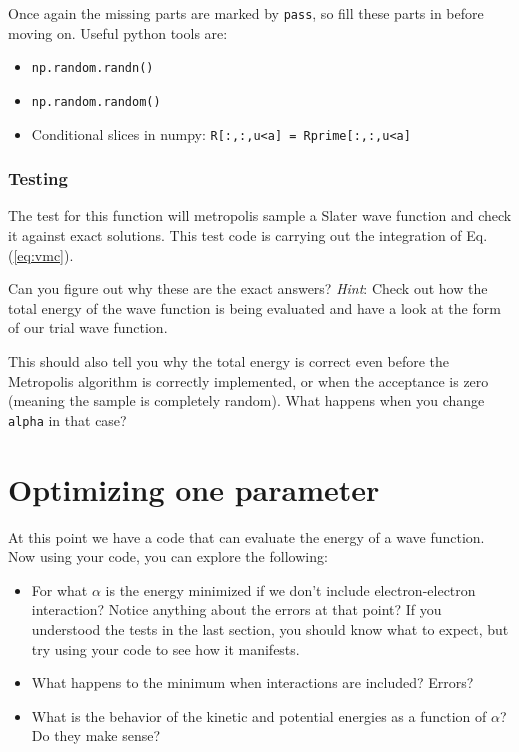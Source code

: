 \documentclass[12pt]{article}
\begin{document}
Once again the missing parts are marked by \verb|pass|, so fill these parts in before moving on. 
Useful python tools are:
\begin{itemize}
\item \verb|np.random.randn()|
\item \verb|np.random.random()|
\item Conditional slices in numpy: \verb|R[:,:,u<a] = Rprime[:,:,u<a]|
\end{itemize}

\subsubsection{Testing}

The test for this function will metropolis sample a Slater wave function and check it against exact solutions. 
This test code is carrying out the integration of Eq. (\ref{eq:vmc}).

Can you figure out why these are the exact answers?
\textit{Hint}: Check out how the total energy of the wave function is being evaluated and have a look at the form of our trial wave function. 

This should also tell you why the total energy is correct even before the Metropolis algorithm is correctly implemented, or when the acceptance is zero (meaning the sample is completely random).
What happens when you change \verb|alpha| in that case?

\section{Optimizing one parameter}

At this point we have a code that can evaluate the energy of a wave function.
Now using your code, you can explore the following:
\begin{itemize}
\item For what $\alpha$ is the energy minimized if we don't include electron-electron interaction? Notice anything about the errors at that point?
  If you understood the tests in the last section, you should know what to expect, but try using your code to see how it manifests.
\item What happens to the minimum when interactions are included? Errors?
\item What is the behavior of the kinetic and potential energies as a function of $\alpha$? Do they make sense?	
\end{itemize}
\end{document}
